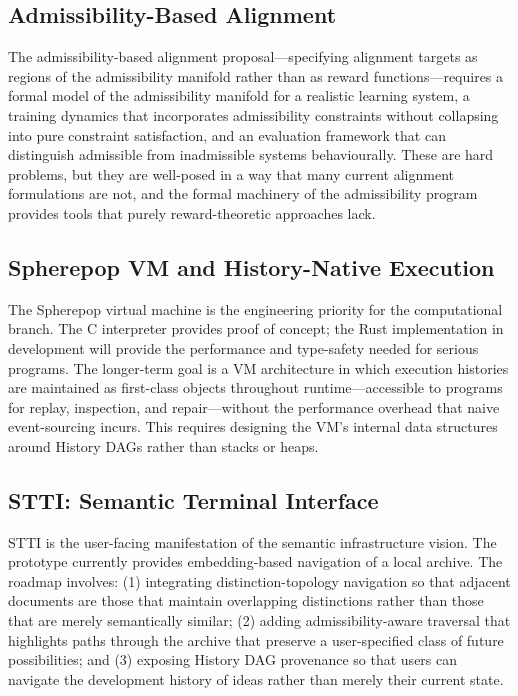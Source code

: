 \documentclass[11pt, oneside]{book}
\theoremstyle{definition}
\theoremstyle{remark}
\begin{document}
\subsection*{Admissibility-Based Alignment}

The admissibility-based alignment proposal---specifying alignment targets as regions of the admissibility manifold rather than as reward functions---requires a formal model of the admissibility manifold for a realistic learning system, a training dynamics that incorporates admissibility constraints without collapsing into pure constraint satisfaction, and an evaluation framework that can distinguish admissible from inadmissible systems behaviourally. These are hard problems, but they are well-posed in a way that many current alignment formulations are not, and the formal machinery of the admissibility program provides tools that purely reward-theoretic approaches lack.

\subsection*{Spherepop VM and History-Native Execution}

The Spherepop virtual machine is the engineering priority for the computational branch. The C interpreter provides proof of concept; the Rust implementation in development will provide the performance and type-safety needed for serious programs. The longer-term goal is a VM architecture in which execution histories are maintained as first-class objects throughout runtime---accessible to programs for replay, inspection, and repair---without the performance overhead that naive event-sourcing incurs. This requires designing the VM's internal data structures around History DAGs rather than stacks or heaps.

\subsection*{STTI: Semantic Terminal Interface}

STTI is the user-facing manifestation of the semantic infrastructure vision. The prototype currently provides embedding-based navigation of a local archive. The roadmap involves: (1) integrating distinction-topology navigation so that adjacent documents are those that maintain overlapping distinctions rather than those that are merely semantically similar; (2) adding admissibility-aware traversal that highlights paths through the archive that preserve a user-specified class of future possibilities; and (3) exposing History DAG provenance so that users can navigate the development history of ideas rather than merely their current state.
\end{document}
